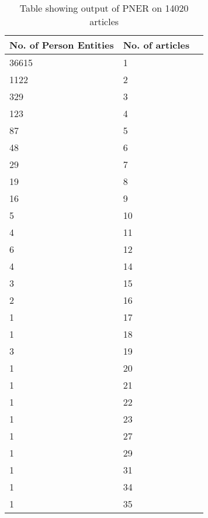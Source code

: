 \begin{table}[h]
  \begin{center}
\begin{tabular}{|l|l|l|}
    \hline
\textbf{No. of Person Entities} & \textbf{No. of articles} \\ \hline
36615                  & 1               \\ \hline
1122                   & 2               \\	\hline
329                    & 3               \\	\hline
123                    & 4               \\	\hline
87                     & 5               \\	\hline
48                     & 6               \\	\hline
29                     & 7               \\	\hline
19                     & 8               \\	\hline
16                     & 9               \\	\hline
5                      & 10              \\	\hline
4                      & 11              \\	\hline
6                      & 12              \\	\hline
4                      & 14              \\	\hline
3                      & 15              \\	\hline
2                      & 16              \\	\hline
1                      & 17              \\	\hline
1                      & 18              \\	\hline
3                      & 19              \\	\hline
1                      & 20              \\	\hline
1                      & 21              \\	\hline
1                      & 22              \\	\hline
1                      & 23              \\	\hline
1                      & 27              \\	\hline
1                      & 29              \\	\hline
1                      & 31              \\	\hline
1                      & 34              \\	\hline
1                      & 35              \\ 	\hline
\end{tabular}
\end{center}
\caption{Table showing output of PNER on 14020 articles}
\label{table:Table1}
\end{table}



